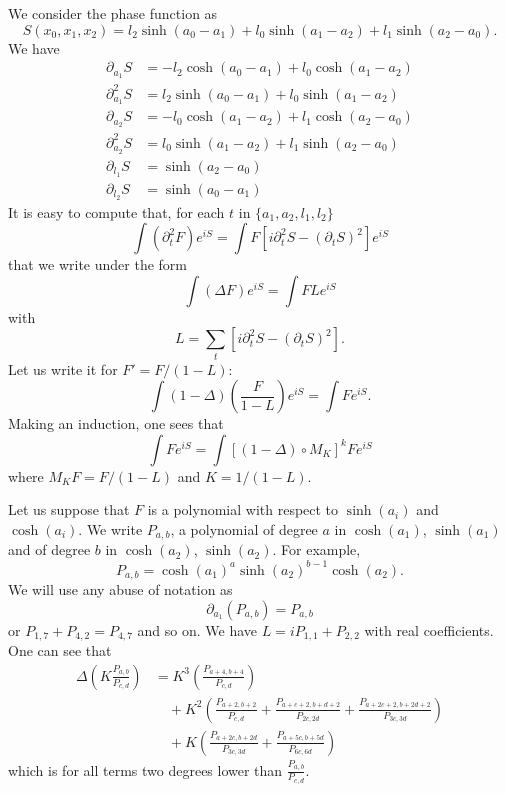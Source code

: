 We consider the phase function as
\begin{equation}
	S(x_0,x_1,x_2)=l_2\sinh(a_0-a_1)+l_0\sinh(a_1-a_2)+l_1\sinh(a_2-a_0).
\end{equation}
We have
\begin{subequations}
	\begin{align}
		\partial_{a_1}S   & =-l_2\cosh(a_0-a_1)+l_0\cosh(a_1-a_2) \\
		\partial^2_{a_1}S & =l_2\sinh(a_0-a_1)+l_0\sinh(a_1-a_2)  \\
		\partial_{a_2}S   & =-l_0\cosh(a_1-a_2)+l_1\cosh(a_2-a_0) \\
		\partial^2_{a_2}S & =l_0\sinh(a_1-a_2)+l_1\sinh(a_2-a_0)  \\
		\partial_{l_1}S   & =\sinh(a_2-a_0)                       \\
		\partial_{l_2}S   & =\sinh(a_0-a_1)
	\end{align}
\end{subequations}
It is easy to compute that, for each $t$ in $\{a_1, a_2, l_1, l_2\}$
\[
	\int (\partial_t^2 F)e^{iS}=\int F[i\partial_t^2S-(\partial_tS)^2]e^{iS}
\]
that we write under the form
\begin{equation}
	\int (\Delta F)e^{iS}=\int FLe^{iS}
\end{equation}
with
\[
	L=\sum_t [i\partial^2_t S-(\partial_t S)^2].
\]
Let us write it for $F'=F/(1-L)$:
\[
	\int (1-\Delta)\left( \frac{F}{1-L} \right)e^{iS}=\int Fe^{iS}.
\]
Making an induction, one sees that
\begin{equation}
	\int Fe^{iS}=\int [(1-\Delta)\circ M_K]^kF e^{iS}
\end{equation}
where $M_K F=F/(1-L)$ and $K=1/(1-L)$.

Let us suppose that $F$ is a polynomial with respect to $\sinh(a_i)$ and $\cosh(a_i)$. We write $P_{a,b}$, a polynomial of degree $a$ in $\cosh(a_1)$, $\sinh(a_1)$ and of degree $b$ in $\cosh(a_2)$, $\sinh(a_2)$. For example,
\[
	P_{a,b}=\cosh(a_1)^{a}\sinh(a_2)^{b-1}\cosh(a_2).
\]
We will use any abuse of notation as
\[
	\partial_{a_1}(P_{a,b})=P_{a,b}
\]
or $P_{1,7}+P_{4,2}=P_{4,7}$ and so on. We have $L=iP_{1,1}+P_{2,2}$ with real coefficients. One can see that
\begin{equation}
	\begin{split}
		\Delta\left( K\frac{P_{a,b}}{P_{c,d}} \right)&=K^3\left( \frac{P_{a+4,b+4}}{P_{c,d}} \right)\\
		&\quad+
		K^2\left( \frac{P_{a+2,b+2}}{P_{c,d}} +\frac{P_{a+c+2,b+d+2}}{P_{2c,2d}}+\frac{P_{a+2c+2,b+2d+2}}{P_{3c,3d}} \right)\\
		&\quad+
		K\left( \frac{P_{a+2c,b+2d}}{P_{3c,3d}}+\frac{P_{a+5c,b+5d}}{P_{6c,6d}} \right)
	\end{split}
\end{equation}
which is for all terms two degrees lower than $\frac{P_{a,b}}{P_{c,d}}$.

